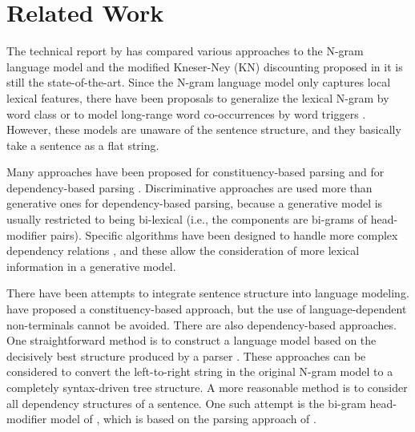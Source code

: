 \documentclass[english]{jnlp_1.4}
\begin{document}
\section{Related Work}
\label{relatedwork}

The technical report by \cite{chen1998} has compared various approaches to the N-gram language model and the modified Kneser-Ney (KN) discounting proposed in it is still the state-of-the-art. Since the N-gram language model only captures local lexical features, there have been proposals to generalize the lexical N-gram by word class \cite{brown1992} or to model long-range word co-occurrences by word triggers \cite{tillmann1997}. However, these models are unaware of the sentence structure, and they basically take a sentence as a flat string.

Many approaches have been proposed for constituency-based parsing \cite{collins1998,klein2003,klein2004} and for dependency-based parsing \cite{eisner1996,lee1997,kudo2002japanese,klein2004,nivre2008,koo2010efficient,zhang2012generalized}. Discriminative approaches \cite{kudo2002japanese,nivre2008} are used more than generative ones for dependency-based parsing, because a generative model is usually restricted to being bi-lexical (i.e., the components are bi-grams of head-modifier pairs). 
Specific algorithms have been designed to handle more complex dependency relations \cite{koo2010efficient,zhang2012generalized},
and these allow the consideration of more lexical information in a generative model.

There have been attempts to integrate sentence structure into language modeling. \cite{chelba2000} have proposed a constituency-based approach, but the use of language-dependent non-terminals cannot be avoided. 
There are also dependency-based approaches. One straightforward method is to construct a language model based on the decisively best structure produced by a parser \cite{stolcke1997,gao2003,graham2010}. These approaches can be considered to convert the left-to-right string in the original N-gram model to a completely syntax-driven tree structure.
A more reasonable method is to consider all dependency structures of a sentence. One such attempt is the bi-gram head-modifier model of \cite{lee1998automatic}, which is based on the parsing approach of \cite{lee1997}. 
\end{document}
